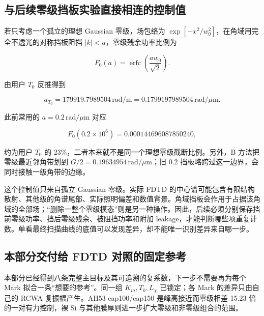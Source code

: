 \documentclass[
  chinese,
  UTF8,
  a4paper,
  11pt]{ctexart}
\begin{document}
\subsection{与后续零级挡板实验直接相连的控制值}\label{ux4e0eux540eux7eedux96f6ux7ea7ux6321ux677fux5b9eux9a8cux76f4ux63a5ux76f8ux8fdeux7684ux63a7ux5236ux503c}

若只考虑一个孤立的理想 Gaussian 零级，场包络为
\(\exp[-x^2/w_0^2]\)，在角域用完全不透光的对称挡板阻挡
\(|k|<a\)，零级残余功率比例为

\[
F_0(a)=\operatorname{erfc}\left(\frac{aw_0}{\sqrt2}\right).
\]

由用户 \(T_0\) 反推得到

\[
\boxed{a_{T_0}=179919.7989504\,\mathrm{rad/m}
=0.1799197989504\,\mathrm{rad}/\mu\mathrm m.}
\]

此前常用的 \(a=0.2\,\mathrm{rad}/\mu\mathrm m\) 对应

\[
F_0(0.2\times10^6)=0.000144696087850240,
\]

约为用户 \(T_0\) 的 23\%，二者本来就不是同一个理想零级截断比例。另外，B
方法把零级最近邻角带划到
\(G/2=0.19634954\,\mathrm{rad}/\mu\mathrm m\)；旧 0.2
挡板略跨过这一边界，会同时接触一级角带的边缘。

这个控制值只来自孤立 Gaussian 零级。实际 FDTD
的中心谱可能包含有限结构散射、其他级的角谱尾部、实际照明偏差和数值背景。角域挡板会作用于占据该角域的全部场；``删除一整个零级模态''则是另一种操作。因此，后续必须分别保存挡前零级功率、挡后零级残余、被阻挡功率和附加
leakage，才能判断哪些项重复计数。单看最终扫描曲线的底值可以发现差异，却不能唯一识别差异来自哪一步。

\subsection{本部分交付给 FDTD
对照的固定参考}\label{ux672cux90e8ux5206ux4ea4ux4ed8ux7ed9-fdtd-ux5bf9ux7167ux7684ux56faux5b9aux53c2ux8003}

本部分已经得到八条完整主目标及其可追溯的复系数，下一步不需要再为每个
Mark 拟合一条``想要的参考''。同一组 \(K_m,T_0,L_\chi\) 已锁定；各 Mark
的差异只由自己的 RCWA 复振幅产生。AH53 cap100/cap150
是峰高接近而零级相差 15.23 倍的一对有力控制，裸 Si
与其他膜厚则进一步扩大零级和非零级组合的范围。
\end{document}
